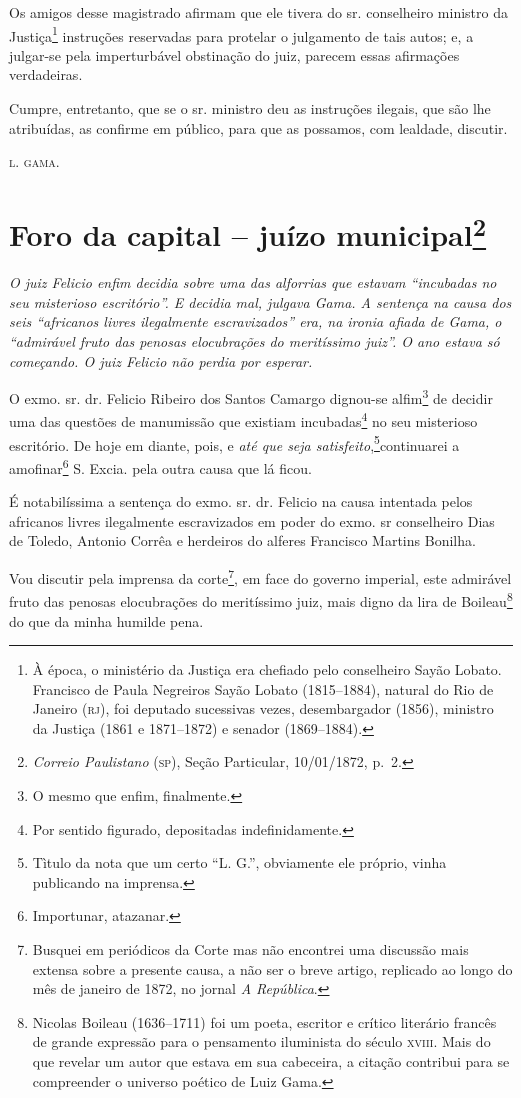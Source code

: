 {\begin{flushright}
Os amigos desse magistrado afirmam que ele tivera do sr. conselheiro
ministro da Justiça\footnote{ À época, o ministério da Justiça era
  chefiado pelo conselheiro Sayão Lobato. Francisco de Paula Negreiros
  Sayão Lobato (1815--1884), natural do Rio de Janeiro (\textsc{rj}), foi deputado
  sucessivas vezes, desembargador (1856), ministro da Justiça (1861 e
  1871--1872) e senador (1869--1884).} instruções reservadas para protelar
o julgamento de tais autos; e, a julgar-se pela imperturbável obstinação
do juiz, parecem essas afirmações verdadeiras.

Cumpre, entretanto, que se o sr. ministro deu as instruções ilegais, que
são lhe atribuídas, as confirme em público, para que as possamos, com
lealdade, discutir.

\textsc{l. gama}.

\chapter{Foro da capital -- juízo municipal\footnote{\emph{Correio Paulistano} (\textsc{sp}), Seção Particular,
  10/01/1872, p.~2.}} %

\begin{didascalia}
\emph{O juiz Felicio enfim decidia sobre uma das alforrias que estavam
``incubadas no seu misterioso escritório''. E decidia mal, julgava Gama. A
sentença na causa dos seis ``africanos livres ilegalmente escravizados''
era, na ironia afiada de Gama, o ``admirável fruto das penosas
elocubrações do meritíssimo juiz''. O ano estava só começando. O juiz
Felicio não perdia por esperar.}
\end{didascalia}

O exmo. sr. dr. Felicio Ribeiro dos Santos Camargo dignou-se
alfim\footnote{ O mesmo que enfim, finalmente.} de decidir uma das
questões de manumissão que existiam incubadas\footnote{ Por sentido
  figurado, depositadas indefinidamente.} no seu misterioso escritório.
De hoje em diante, pois, e \emph{até que seja satisfeito},\footnote{ Tìtulo da nota que um certo ``L. G.'', obviamente ele próprio,
  vinha publicando na imprensa.}continuarei a amofinar\footnote{
  Importunar, atazanar.} S. Excia. pela outra causa que lá ficou.

É notabilíssima a sentença do exmo. sr. dr. Felicio na causa intentada
pelos africanos livres ilegalmente escravizados em poder do exmo. sr
conselheiro Dias de Toledo, Antonio Corrêa e herdeiros do alferes
Francisco Martins Bonilha.

Vou discutir pela imprensa da corte\footnote{ Busquei em periódicos da
  Corte mas não encontrei uma discussão mais extensa sobre a presente
  causa, a não ser o breve artigo, replicado ao longo do mês de janeiro
  de 1872, no jornal \emph{A República}.}, em face do governo imperial,
este admirável fruto das penosas elocubrações do meritíssimo juiz, mais
digno da lira de Boileau\footnote{Nicolas Boileau (1636--1711) foi um
  poeta, escritor e crítico literário francês de grande expressão para o
  pensamento iluminista do século \textsc{xviii}. Mais do que revelar um autor
  que estava em sua cabeceira, a citação contribui para se compreender o
  universo poético de Luiz Gama.} do que da minha humilde pena.


\end{flushright}}
